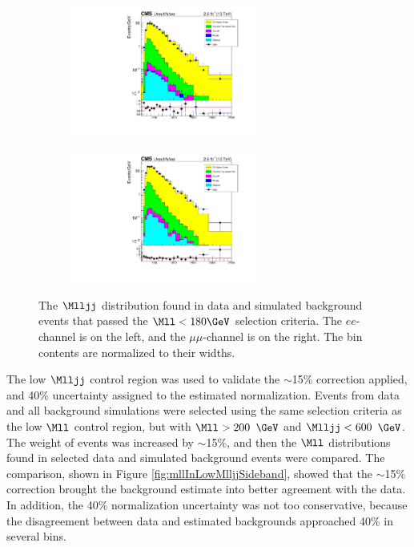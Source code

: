 \begin{figure}
	\centering
	\begin{subfigure}[t]{2.4in}
		\centering
		\includegraphics[width=2.4in]{figures/Mlljj_eeChnl_lowMllCR_AMCNLO.pdf}
	\end{subfigure}
	\thickspace
	\begin{subfigure}[t]{2.4in}
		\centering
		\includegraphics[width=2.4in]{figures/Mlljj_mumuChnl_lowMllCR_AMCNLO.pdf}
	\end{subfigure}
	\caption{The $\Mlljj$ distribution found in data and simulated background events that passed the $\Mll < 180 \GeV$ selection criteria.  
		The $ee$-channel is on the left, and the $\mu\mu$-channel is on the right.  The bin contents are normalized to their widths.}
	\label{fig:mlljjLowMllCRAMC}
\end{figure}

The low $\Mlljj$ control region was used to validate the $\sim$15\% correction applied, and 40\% uncertainty assigned to the estimated 
\DY normalization.  Events from data and all background simulations were selected using the same selection criteria as the low $\Mll$ 
control region, but with $\Mll > 200$ $\GeV$ and $\Mlljj < 600$ $\GeV$.  The weight of \DY events was increased by $\sim$15\%, and then 
the $\Mll$ distributions found in selected data and simulated background events were compared.  The comparison, shown in Figure 
\ref{fig:mllInLowMlljjSideband}, showed that the $\sim$15\% \DY correction brought the background estimate into better agreement with the 
data.  In addition, the 40\% \DY normalization uncertainty was not too conservative, because the disagreement between data and estimated 
backgrounds approached 40\% in several bins.

